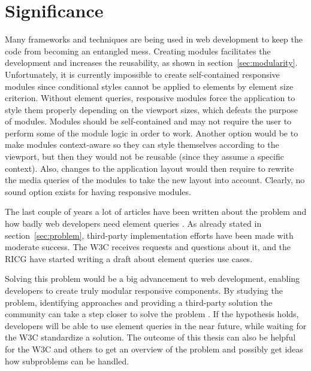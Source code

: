 \documentclass[a4paper,11pt]{kth-mag}
\begin{document}
    \section{Significance}
      Many frameworks and techniques are being used in \gls{web} development to keep the code from becoming an entangled mess.
      Creating modules facilitates the development and increases the reusability, as shown in section~\ref{sec:modularity}.
      Unfortunately, it is currently impossible to create \gls{self-contained} \gls{responsive} modules since conditional styles cannot be applied to \glspl{element} by \gls{element} size criterion.
      Without element queries, \gls{responsive} modules force the application to style them properly depending on the \gls{viewport} sizes, which defeats the purpose of modules.
      Modules should be \gls{self-contained} and may not require the user to perform some of the module logic in order to work.
      Another option would be to make modules context-aware so they can style themselves according to the \gls{viewport}, but then they would not be reusable (since they assume a specific context).
      Also, changes to the application layout would then require to rewrite the \gls{media queries} of the modules to take the new layout into account.
      Clearly, no sound option exists for having \gls{responsive} modules.

      The last couple of years a lot of articles have been written about the problem and how badly \gls{web} developers need element queries \cite{eq_article_localised-css,eq_article_backalley,eq_article_mqhack,eq_article_tabatkjr,eq_article_filament,eq_article_tyson,eq_article_neal,eq_article_css-tricks,eq_article_hugo,eq_article_fremycompany,eq_article_discource,eq_article_matt}.
      As already stated in section~\ref{sec:problem}, \gls{third-party} implementation efforts have been made with moderate success.
      The \gls{W3C} receives requests and questions about it, and the \gls{RICG} have started writing a draft \cite{ricg_draft} about element queries use cases.

      Solving this problem would be a big advancement to \gls{web} development, enabling developers to create truly modular \gls{responsive} components.
      By studying the problem, identifying approaches and providing a \gls{third-party} solution the community can take a step closer to solve the problem .
      If the hypothesis holds, developers will be able to use element queries in the near future, while waiting for the \gls{W3C} standardize a solution. 
      The outcome of this thesis can also be helpful for the \gls{W3C} and others to get an overview of the problem and possibly get ideas how subproblems can be handled.
\end{document}
